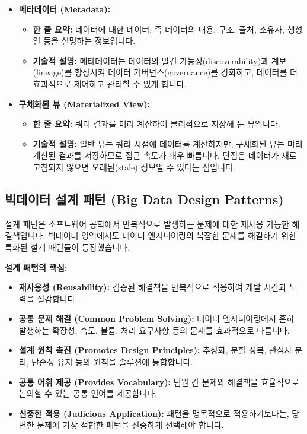 \documentclass[11pt,a4paper]{article}
\theoremstyle{definition}
\begin{document}
\begin{itemize}
\begin{itemize}
        \item \textbf{주요 차이점:} 데이터의 물리적 저장 위치와 프레임워크에 의한 데이터 관리 범위입니다. 외부 테이블은 데이터의 독립성을 유지할 수 있어 다른 시스템과의 공유에 유리합니다.
    \end{itemize}
    \item \textbf{메타데이터 (Metadata):}
    \begin{itemize}
        \item \textbf{한 줄 요약:} 데이터에 대한 데이터, 즉 데이터의 내용, 구조, 출처, 소유자, 생성일 등을 설명하는 정보입니다.
        \item \textbf{기술적 설명:} 메타데이터는 데이터의 발견 가능성(discoverability)과 계보(lineage)를 향상시켜 데이터 거버넌스(governance)를 강화하고, 데이터를 더 효과적으로 제어하고 관리할 수 있게 합니다.
    \end{itemize}
    \item \textbf{구체화된 뷰 (Materialized View):}
    \begin{itemize}
        \item \textbf{한 줄 요약:} 쿼리 결과를 미리 계산하여 물리적으로 저장해 둔 뷰입니다.
        \item \textbf{기술적 설명:} 일반 뷰는 쿼리 시점에 데이터를 계산하지만, 구체화된 뷰는 미리 계산된 결과를 저장하므로 접근 속도가 매우 빠릅니다. 단점은 데이터가 새로고침되지 않으면 오래된(stale) 정보일 수 있다는 점입니다.
    \end{itemize}
\end{itemize}

\subsection{빅데이터 설계 패턴 (Big Data Design Patterns)}
설계 패턴은 소프트웨어 공학에서 반복적으로 발생하는 문제에 대한 재사용 가능한 해결책입니다. 빅데이터 영역에서도 데이터 엔지니어링의 복잡한 문제를 해결하기 위한 특화된 설계 패턴들이 등장했습니다.

\begin{summarybox}
\textbf{설계 패턴의 핵심:}
\begin{itemize}
    \item \textbf{재사용성 (Reusability):} 검증된 해결책을 반복적으로 적용하여 개발 시간과 노력을 절감합니다.
    \item \textbf{공통 문제 해결 (Common Problem Solving):} 데이터 엔지니어링에서 흔히 발생하는 확장성, 속도, 볼륨, 처리 요구사항 등의 문제를 효과적으로 다룹니다.
    \item \textbf{설계 원칙 촉진 (Promotes Design Principles):} 추상화, 분할 정복, 관심사 분리, 단순성 유지 등의 원칙을 솔루션에 통합합니다.
    \item \textbf{공통 어휘 제공 (Provides Vocabulary):} 팀원 간 문제와 해결책을 효율적으로 논의할 수 있는 공통 언어를 제공합니다.
    \item \textbf{신중한 적용 (Judicious Application):} 패턴을 맹목적으로 적용하기보다는, 당면한 문제에 가장 적합한 패턴을 신중하게 선택해야 합니다.
\end{itemize}
\end{summarybox}
\end{document}
